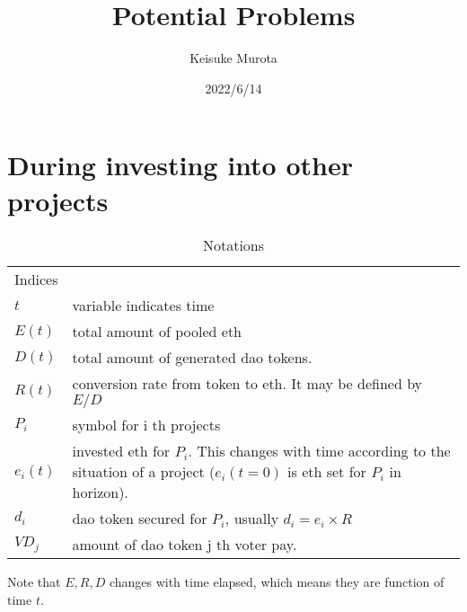 \documentclass{jarticle}
\begin{document}
\title{Potential Problems}
\author{Keisuke Murota}
\date{2022/6/14}



\begin{titlepage}
\maketitle
\end{titlepage}
\setcounter{page}{1} %
\newpage
{}  %
\setcounter{page}{1} %


\section{During investing into other projects}
\begin{table}
\caption{Notations}
\begin{tabularx}{\textwidth}{@{}p{}X@{}}
\toprule
  Indices \\
  $t$ & variable indicates time\\
  $E(t)$ & total amount of pooled eth \\
  $D(t)$ & total amount of generated dao tokens. \\
  $R(t)$ & conversion rate from token to eth. It may be defined by $E/D$ \\
  $P_i$ & symbol for i th projects\\
  $e_i(t)$ & invested eth for $P_i$. This changes with time according to the situation of a project ($e_i(t=0)$ is eth set for $P_i$ in horizon).\\
  $d_i$ & dao token secured for $P_i$, usually $d_i = e_i \times R$\\
  $VD_j$ & amount of dao token j th voter pay.\\
\bottomrule
\end{tabularx}
Note that $E, R, D $ changes with time elapsed, which means they are function of time $t$.
\end{table}
\end{document}
